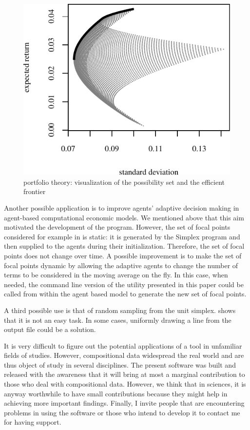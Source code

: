 \documentclass{jors}
\begin{document}
\begin{figure}[ht]
	\centering
	\includegraphics[scale=1.0]{set-0.pdf}
	\caption{portfolio theory: visualization of the possibility set and the efficient frontier}
	\label{fig:portfolios}
\end{figure}


Another possible application is to improve agents' adaptive decision making in agent-based computational economic models. 
We mentioned above that this aim motivated the development of the program.  
However, the set of focal points considered for example in \cite{icaart12} is static: it is generated by the Simplex program and then supplied to the agents during their initialization. Therefore, the set of focal points does not change over time. A possible improvement is to make the set of focal points dynamic by allowing the adaptive agents to change the number of terms to be considered in the moving average on the fly. In this case, when needed, the command line version of the utility presented in this paper could be called from within the agent based model to generate the new set of focal points.

A third possible use is that of random sampling from the unit simplex. \cite{sampling04} shows that it is not an easy task. In some cases, uniformly drawing a line from the output file could be a solution. 

It is very difficult to figure out the potential applications of a tool in unfamiliar fields of studies. However, compositional data widespread the real world and are thus object of study in several disciplines. The present software was built and released with the awareness that it will bring at most a marginal contribution to those who deal with compositional data. However, we think that in sciences, it is anyway worthwhile to have small contributions because they might help in achieving more important findings. Finally, I invite people that are encountering problems in using the software or those who intend to develop it to contact me for having support.  
\end{document}
